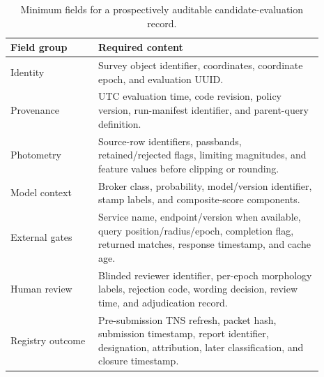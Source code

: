 \documentclass[11pt]{article}
\begin{document}
\begin{table}[ht]
\centering
\small
\caption{Minimum fields for a prospectively auditable candidate-evaluation record.}
\label{tab:schema}
\begin{tabular}{p{0.25\linewidth}p{0.64\linewidth}}
\toprule
Field group & Required content \\
\midrule
Identity & Survey object identifier, coordinates, coordinate epoch, and evaluation UUID. \\
Provenance & UTC evaluation time, code revision, policy version, run-manifest identifier, and parent-query definition. \\
Photometry & Source-row identifiers, passbands, retained/rejected flags, limiting magnitudes, and feature values before clipping or rounding. \\
Model context & Broker class, probability, model/version identifier, stamp labels, and composite-score components. \\
External gates & Service name, endpoint/version when available, query position/radius/epoch, completion flag, returned matches, response timestamp, and cache age. \\
Human review & Blinded reviewer identifier, per-epoch morphology labels, rejection code, wording decision, review time, and adjudication record. \\
Registry outcome & Pre-submission TNS refresh, packet hash, submission timestamp, report identifier, designation, attribution, later classification, and closure timestamp. \\
\bottomrule
\end{tabular}
\end{table}

\clearpage



\end{document}
